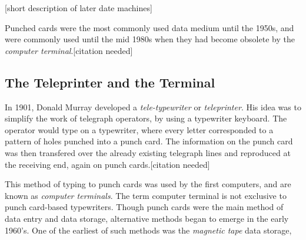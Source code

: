 [short description of later date machines]

Punched cards were the most commonly used data medium until the 1950s, and were commonly used until the mid 1980s when they had become obsolete by the \emph{computer terminal}.[citation needed]

\subsection{The Teleprinter and the Terminal}
In 1901, Donald Murray developed a \emph{tele-typewriter} or \emph{teleprinter}. His idea was to simplify the work of telegraph operators, by using a typewriter keyboard. The operator would type on a typewriter, where every letter corresponded to a pattern of holes punched into a punch card. The information on the punch card was then transfered over the already existing telegraph lines and reproduced at the receiving end, again on punch cards.[citation needed]

This method of typing to punch cards was used by the first computers, and are known as \emph{computer terminals}. The term computer terminal is not exclusive to punch card-based typewriters. Though punch cards were the main method of data entry and data storage, alternative methods began to emerge in the early 1960's. One of the earliest of such methods was the \emph{magnetic tape} data storage, 

